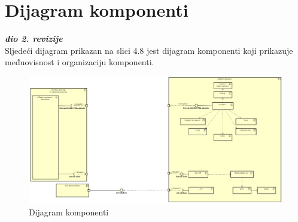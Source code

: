 			\eject
		\section{Dijagram komponenti}
		
			\textbf{\textit{dio 2. revizije}}\\
		
            Sljedeći dijagram prikazan na slici 4.8 jest dijagram komponenti koji prikazuje međuovisnost i organizaciju komponenti. 
            
        \begin{figure}[H]
			\hspace*{-1.5cm}
			\includegraphics[scale=0.67]{dijagrami/dijagram_komponenti.png} %
			\centering
			\caption{Dijagram komponenti}
			\label{fig:promjene}
		\end{figure}